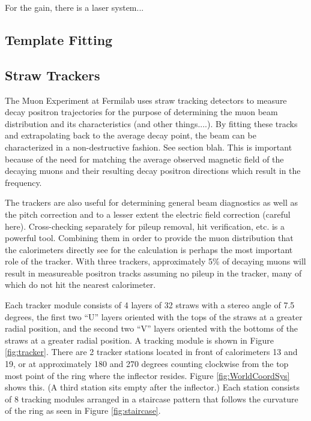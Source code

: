For the gain, there is a laser system...









\cite{Kaspar:2016ofv}



\subsection{Template Fitting}
\label{sec:TemplateFitting}





\subsection{Straw Trackers}
\label{sec:StrawTrackers}

The Muon \gmtwo Experiment at Fermilab uses straw tracking detectors to measure decay positron trajectories for the purpose of determining the muon beam distribution and its characteristics (and other things....). By fitting these tracks and extrapolating back to the average decay point, the beam can be characterized in a non-destructive fashion. See section blah. This is important because of the need for matching the average observed magnetic field of the decaying muons and their resulting decay positron directions which result in the \wa frequency.

The trackers are also useful for determining general beam diagnostics as well as the pitch correction and to a lesser extent the electric field correction (careful here). Cross-checking separately for pileup removal, hit verification, etc. is a powerful tool. Combining them in order to provide the muon distribution that the calorimeters directly see for the \wa calculation is perhaps the most important role of the tracker. With three trackers, approximately 5\% of decaying muons will result in measureable positron tracks assuming no pileup in the tracker, many of which do not hit the nearest calorimeter.

Each tracker module consists of 4 layers of 32 straws with a stereo angle of 7.5 degrees, the first two ``U'' layers oriented with the tops of the straws at a greater radial position, and the second two ``V'' layers oriented with the bottoms of the straws at a greater radial position. A tracking module is shown in Figure \ref{fig:tracker}. There are 2 tracker stations located in front of calorimeters 13 and 19, or at approximately 180 and 270 degrees counting clockwise from the top most point of the ring where the inflector resides. Figure \ref{fig:WorldCoordSys} shows this. (A third station sits empty after the inflector.) Each station consists of 8 tracking modules arranged in a staircase pattern that follows the curvature of the ring as seen in Figure \ref{fig:staircase}.

